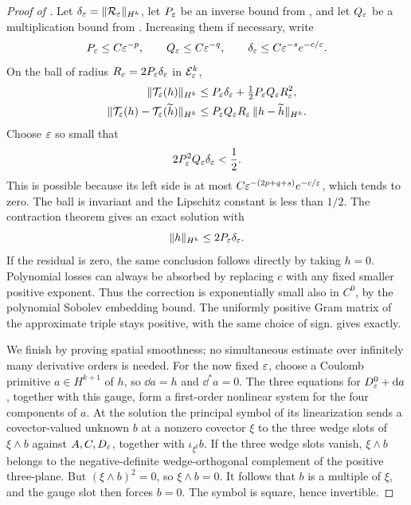 \begin{proof}[Proof of ]
Let $\delta_\varepsilon=\|\mathcal R_\varepsilon\|_{H^k}$, let $P_\varepsilon$ be an
inverse bound from , and let
$Q_\varepsilon$ be a multiplication bound from
.  Increasing them if necessary, write
\begin{equation}
  P_\varepsilon\le C\varepsilon^{-p},\qquad
  Q_\varepsilon\le C\varepsilon^{-q},\qquad
  \delta_\varepsilon\le C\varepsilon^{-s}e^{-c/\varepsilon}.
  \label{eq:auxiliary-polynomial-losses}
\end{equation}
On the ball of radius $R_\varepsilon=2P_\varepsilon\delta_\varepsilon$ in
$\mathcal E^k_\varepsilon$,
\begin{align}
  \|\mathcal T_\varepsilon(h)\|_{H^k}
  &\le P_\varepsilon\delta_\varepsilon+
          \tfrac12P_\varepsilon Q_\varepsilon R_\varepsilon^2,
     \label{eq:auxiliary-ball-bound}\\
  \|\mathcal T_\varepsilon(h)-\mathcal T_\varepsilon(\widetilde h)\|_{H^k}
  &\le P_\varepsilon Q_\varepsilon R_\varepsilon\,
           \|h-\widetilde h\|_{H^k}.
     \label{eq:auxiliary-lipschitz-bound}
\end{align}
Choose $\varepsilon$ so small that
\begin{equation}
  2P_\varepsilon^2Q_\varepsilon\delta_\varepsilon<\frac12.
  \label{eq:auxiliary-smallness}
\end{equation}
This is possible because its left side is at most
$C\varepsilon^{-(2p+q+s)}e^{-c/\varepsilon}$, which tends to zero.
The ball is invariant and the Lipschitz constant is less than
$1/2$.  The contraction theorem gives an exact solution with
\begin{equation}
  \|h\|_{H^k}\le 2P_\varepsilon\delta_\varepsilon.
  \label{eq:auxiliary-correction-size}
\end{equation}
If the residual is zero, the same conclusion follows directly by
taking $h=0$.  Polynomial losses can always be absorbed by replacing
$c$ with any fixed smaller positive exponent.  Thus the correction
is exponentially small also in $C^0$, by the polynomial Sobolev
embedding bound.  The uniformly positive Gram matrix of the
approximate triple stays positive, with the same choice of sign.
 gives
 exactly.

We finish by proving spatial smoothness; no simultaneous estimate
over infinitely many derivative orders is needed.  For the now fixed
$\varepsilon$, choose a Coulomb primitive $a\in H^{k+1}$ of $h$, so
$\dd a=h$ and $\dd^*a=0$.  The three equations for
$D^0_\varepsilon+\mathrm d a$, together with this gauge, form a first-order
nonlinear system for the four components of $a$.
At the solution the principal symbol of its linearization sends a covector-valued
unknown $b$ at a nonzero covector $\xi$ to the three wedge slots
of $\xi\wedge b$ against $A,C,D_\varepsilon$, together with
$\iota_{\xi^\sharp}b$.
If the three wedge slots vanish, $\xi\wedge b$ belongs to the
negative-definite wedge-orthogonal complement of the positive
three-plane.  But $(\xi\wedge b)^2=0$, so $\xi\wedge b=0$.
It follows that $b$ is a multiple of $\xi$, and the gauge slot
then forces $b=0$.  The symbol is square, hence invertible.


\end{proof}
